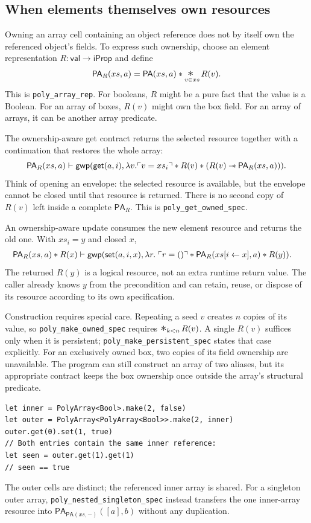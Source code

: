 \subsection{When elements themselves own resources}

Owning an array cell containing an object reference does not by itself
own the referenced object's fields. To express such ownership, choose an
element representation $R:\mathsf{val}\to\mathsf{iProp}$ and define
\[
  \mathsf{PA}_R(xs,a)
  =\mathsf{PA}(xs,a)\sep\bigsep_{v\in xs} R(v).
\]
This is \texttt{poly\_array\_rep}. For booleans, $R$ might be a pure fact
that the value is a Boolean. For an array of boxes, $R(v)$ might own the
box field. For an array of arrays, it can be another array predicate.

The ownership-aware get contract returns the selected resource together
with a continuation that restores the whole array:
\[
 \mathsf{PA}_R(xs,a)\vdash
 \mathsf{gwp}(\mathsf{get}(a,i),
 \lambda v.\ulcorner v=xs_i \urcorner\mathbin{*} R(v)\mathbin{*}
       (R(v)\mathbin{-\!\!*}\mathsf{PA}_R(xs,a))).
\]
Think of opening an envelope: the selected resource is available, but the
envelope cannot be closed until that resource is returned. There is no
second copy of $R(v)$ left inside a complete $\mathsf{PA}_R$.
This is \texttt{poly\_get\_owned\_spec}.

An ownership-aware update consumes the new element resource and returns
the old one. With $xs_i=y$ and closed $x$,
\[
\begin{aligned}
 \mathsf{PA}_R(xs,a)\mathbin{*} R(x)\vdash
 \mathsf{gwp}(\mathsf{set}(a,i,x),\lambda r.\;&\ulcorner r=() \urcorner\mathbin{*}
 \mathsf{PA}_R(xs[i\leftarrow x],a)\mathbin{*} R(y)).
\end{aligned}
\]
The returned $R(y)$ is a logical resource, not an extra runtime return
value. The caller already knows $y$ from the precondition and can retain,
reuse, or dispose of its resource according to its own specification.

Construction requires special care. Repeating a seed $v$ creates $n$
copies of its value, so \texttt{poly\_make\_owned\_spec} requires
$\bigsep_{k<n} R(v)$. A single $R(v)$ suffices only when it is persistent;
\texttt{poly\_make\_persistent\_spec} states that case explicitly.
For an exclusively owned box, two copies of its field ownership are
unavailable. The program can still construct an array of two aliases,
but its appropriate contract keeps the box ownership once outside the
array's structural predicate.

\begin{lstlisting}
let inner = PolyArray<Bool>.make(2, false)
let outer = PolyArray<PolyArray<Bool>>.make(2, inner)
outer.get(0).set(1, true)
// Both entries contain the same inner reference:
let seen = outer.get(1).get(1)
// seen == true
\end{lstlisting}
The outer cells are distinct; the referenced inner array is shared.
For a singleton outer array, \texttt{poly\_nested\_singleton\_spec}
instead transfers the one inner-array resource into
$\mathsf{PA}_{\mathsf{PA}(xs,-)}([a],b)$ without any duplication.

